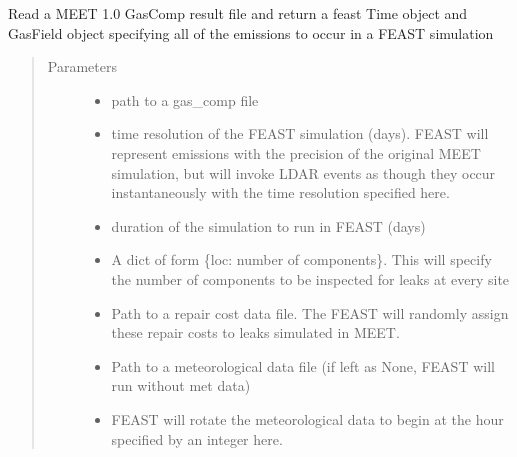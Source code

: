 \documentclass[letterpaper,10pt,english]{sphinxmanual}
\begin{document}

\begin{fulllineitems}
\label{\detokenize{index:feast.MEET_1_importer.gascomp_reader}}
Read a MEET 1.0 GasComp result file and return a feast Time object and GasField object specifying all of the
emissions to occur in a FEAST simulation
\begin{quote}\begin{description}
\item[{Parameters}] \leavevmode\begin{itemize}
\item {} 
 \textendash{} path to a gas\_comp file

\item {} 
 \textendash{} time resolution of the FEAST simulation (days). FEAST will represent emissions with the     precision of the original MEET simulation, but will invoke LDAR events as though they occur instantaneously with     the time resolution specified here.

\item {} 
 \textendash{} duration of the simulation to run in FEAST (days)

\item {} 
 \textendash{} A dict of form \{loc: number of components\}. This will specify the number of components to     be inspected for leaks at every site

\item {} 
 \textendash{} Path to a repair cost data file. The FEAST will randomly assign these repair costs to leaks     simulated in MEET.

\item {} 
 \textendash{} Path to a meteorological data file (if left as None, FEAST will run without met data)

\item {} 
 \textendash{} FEAST will rotate the meteorological data to begin at the hour specified by an integer here.


\end{itemize}
\end{description}
\end{quote}
\end{fulllineitems}
\end{document}
